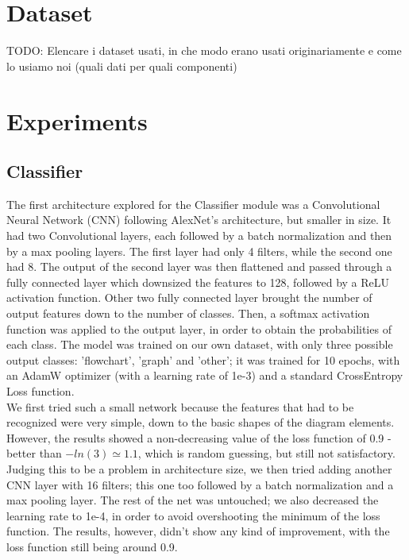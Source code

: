 \documentclass[conference]{IEEEtran}
\begin{document}
\section{Dataset}
TODO: Elencare i dataset usati, in che modo erano usati originariamente e come lo usiamo noi (quali dati per quali componenti) \\

\section{Experiments}

\subsection{Classifier}
\label{exp:classifier}
The first architecture explored for the Classifier module was a Convolutional Neural Network (CNN) following AlexNet's architecture, but smaller in size.
It had two Convolutional layers, each followed by a batch normalization and then by a max pooling layers. The first layer had only 4 filters, while the second one had 8.
The output of the second layer was then flattened and passed through a fully connected layer which downsized the features to 128, followed by a ReLU activation function. Other two fully connected layer brought the number of output features down to the number of classes.
Then, a softmax activation function was applied to the output layer, in order to obtain the probabilities of each class.
The model was trained on our own dataset, with only three possible output classes: 'flowchart', 'graph' and 'other'; it was trained for 10 epochs, with an AdamW optimizer (with a learning rate of 1e-3) and a standard CrossEntropy Loss function.
\\

We first tried such a small network because the features that had to be recognized were very simple, down to the basic shapes of the diagram elements.
However, the results showed a non-decreasing value of the loss function of 0.9 - better than $-ln(3) \simeq 1.1$, which is random guessing, but still not satisfactory.
\\

Judging this to be a problem in architecture size, we then tried adding another CNN layer with 16 filters; this one too followed by a batch normalization and a max pooling layer.
The rest of the net was untouched; we also decreased the learning rate to 1e-4, in order to avoid overshooting the minimum of the loss function.
The results, however, didn't show any kind of improvement, with the loss function still being around 0.9.
\\
\end{document}
